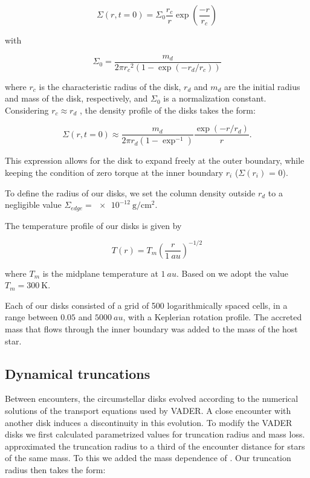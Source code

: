 \documentclass[fleqn,usenatbib]{mnras}
\begin{document}
\begin{equation}\label{profile}
\Sigma(r, t=0) = \Sigma_0 \frac{r_c}{r} \exp\left(\frac{-r}{r_c}\right)
\end{equation}

\noindent
with

\begin{equation}
\Sigma_0 = \frac{m_d}{2 \pi {r_c}^2 \left(1 - \exp\left(-r_d/r_c\right)\right)}
\end{equation}

\noindent
where $r_c$ is the characteristic radius of the disk, $r_d$ and $m_d$ are the initial radius and mass of the disk, respectively, and $\Sigma_0$ is a normalization constant. Considering $r_c \approx r_d$ \citep{anderson2013}, the density profile of the disks takes the form:

\begin{equation}
\Sigma(r, t=0) \approx \frac{m_d}{2 \pi r_d \left(1 - \exp^{-1}\right)} \frac{\exp(-r/r_d)}{r}.
\end{equation}

This expression allows for the disk to expand freely at the outer boundary, while keeping the condition of zero torque at the inner boundary $r_i$ ($\Sigma(r_i)$ = 0).

To define the radius of our disks, we set the column density outside $r_d$ to a negligible value $\Sigma_{edge} = \SI{e-12}{\gram\per\square\cm}$. 

The temperature profile of our disks is given by

\begin{equation}
T(r) = T_m \left(\frac{r}{\SI{1}{au}}\right)^{-1/2}
\end{equation}

\noindent
where $T_m$ is the midplane temperature at $\SI{1}{au}$. Based on \citet{anderson2013} we adopt the value $T_m = \SI{300}{\K}$.


Each of our disks consisted of a grid of 500 logarithmically spaced cells, in a range between $0.05$ and $\SI{5000}{au}$, with a Keplerian rotation profile. The accreted mass that flows through the inner boundary was added to the mass of the host star.

\subsection{Dynamical truncations}\label{truncations}
Between encounters, the circumstellar disks evolved according to the numerical solutions of the transport equations used by VADER. A close encounter with another disk induces a discontinuity in this evolution. To modify the VADER disks we first calculated parametrized values for truncation radius and mass loss. \citet{rosotti2014} approximated the truncation radius to a third of the encounter distance for stars of the same mass. To this we added the mass dependence of \citet{bhandare2016}. Our truncation radius then takes the form:
\end{document}
